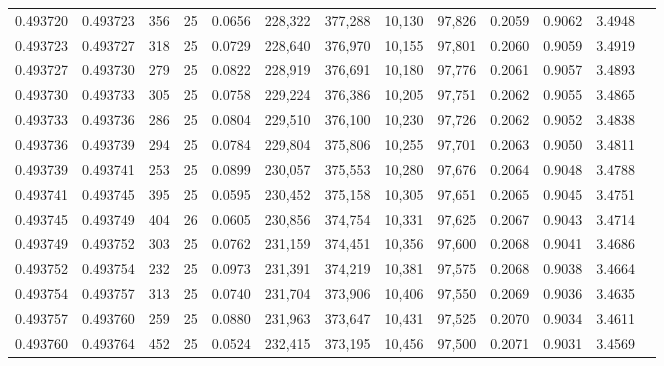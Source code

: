 \begin{tabular}{rrrrrrrrrrrrr}
0.493720 & 0.493723 &   356 &  25 &                                     0.0656 & 228,322 & 377,288 &  10,130 &  97,826 & 0.2059 & 0.9062 & 3.4948 \\
0.493723 & 0.493727 &   318 &  25 &                                     0.0729 & 228,640 & 376,970 &  10,155 &  97,801 & 0.2060 & 0.9059 & 3.4919 \\
0.493727 & 0.493730 &   279 &  25 &                                     0.0822 & 228,919 & 376,691 &  10,180 &  97,776 & 0.2061 & 0.9057 & 3.4893 \\
0.493730 & 0.493733 &   305 &  25 &                                     0.0758 & 229,224 & 376,386 &  10,205 &  97,751 & 0.2062 & 0.9055 & 3.4865 \\
0.493733 & 0.493736 &   286 &  25 &                                     0.0804 & 229,510 & 376,100 &  10,230 &  97,726 & 0.2062 & 0.9052 & 3.4838 \\
0.493736 & 0.493739 &   294 &  25 &                                     0.0784 & 229,804 & 375,806 &  10,255 &  97,701 & 0.2063 & 0.9050 & 3.4811 \\
0.493739 & 0.493741 &   253 &  25 &                                     0.0899 & 230,057 & 375,553 &  10,280 &  97,676 & 0.2064 & 0.9048 & 3.4788 \\
0.493741 & 0.493745 &   395 &  25 &                                     0.0595 & 230,452 & 375,158 &  10,305 &  97,651 & 0.2065 & 0.9045 & 3.4751 \\
0.493745 & 0.493749 &   404 &  26 &                                     0.0605 & 230,856 & 374,754 &  10,331 &  97,625 & 0.2067 & 0.9043 & 3.4714 \\
0.493749 & 0.493752 &   303 &  25 &                                     0.0762 & 231,159 & 374,451 &  10,356 &  97,600 & 0.2068 & 0.9041 & 3.4686 \\
0.493752 & 0.493754 &   232 &  25 &                                     0.0973 & 231,391 & 374,219 &  10,381 &  97,575 & 0.2068 & 0.9038 & 3.4664 \\
0.493754 & 0.493757 &   313 &  25 &                                     0.0740 & 231,704 & 373,906 &  10,406 &  97,550 & 0.2069 & 0.9036 & 3.4635 \\
0.493757 & 0.493760 &   259 &  25 &                                     0.0880 & 231,963 & 373,647 &  10,431 &  97,525 & 0.2070 & 0.9034 & 3.4611 \\
0.493760 & 0.493764 &   452 &  25 &                                     0.0524 & 232,415 & 373,195 &  10,456 &  97,500 & 0.2071 & 0.9031 & 3.4569 \\

\end{tabular}
